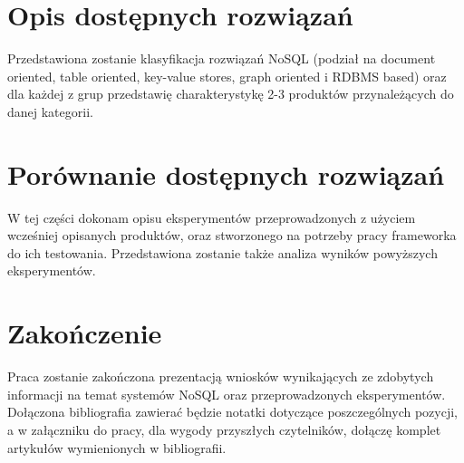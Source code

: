 \documentclass[a4paper,11pt]{article}
\begin{document}
\section{Opis dostępnych rozwiązań}
Przedstawiona zostanie klasyfikacja rozwiązań NoSQL (podział na document
oriented, table oriented, key-value stores, graph oriented i RDBMS based) oraz
dla każdej z grup przedstawię charakterystykę 2-3 produktów przynależących do
danej kategorii.

\section{Porównanie dostępnych rozwiązań}
W tej części dokonam opisu eksperymentów przeprowadzonych z użyciem wcześniej
opisanych produktów, oraz stworzonego na potrzeby pracy frameworka do ich
testowania. Przedstawiona zostanie także analiza wyników powyższych
eksperymentów.

\section{Zakończenie}
Praca zostanie zakończona prezentacją wniosków wynikających ze zdobytych
informacji na temat systemów NoSQL oraz przeprowadzonych eksperymentów.
Dołączona bibliografia zawierać będzie notatki dotyczące poszczególnych
pozycji, a w załączniku do pracy, dla wygody przyszłych czytelników,
dołączę komplet artykułów wymienionych w bibliografii.


\end{document}
